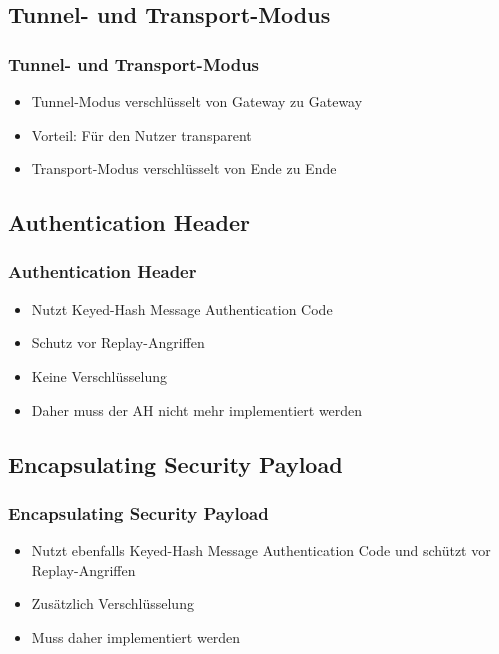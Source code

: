 \documentclass[t]{beamer}
\begin{document}
\subsection*{Tunnel- und Transport-Modus}
\begin{frame}
	\frametitle{Tunnel- und Transport-Modus}
	\begin{itemize}
		\vfill
		\item Tunnel-Modus verschlüsselt von Gateway zu Gateway
		\item Vorteil: Für den Nutzer transparent
		\vfill
		\item Transport-Modus verschlüsselt von Ende zu Ende %
		\vfill
	\end{itemize}
\end{frame}

\subsection*{Authentication Header}
\begin{frame}
	\frametitle{Authentication Header}
	\begin{itemize}
		\vfill
		\item Nutzt Keyed-Hash Message Authentication Code
		\vfill
		\item Schutz vor Replay-Angriffen
		\vfill
		\item Keine Verschlüsselung
		\vfill
		\item Daher muss der AH nicht mehr implementiert werden
		\vfill
	\end{itemize}
\end{frame}

\subsection*{Encapsulating Security Payload}
\begin{frame}
	\frametitle{Encapsulating Security Payload}
	\begin{itemize}
		\vfill
		\item Nutzt ebenfalls Keyed-Hash Message Authentication Code und schützt vor Replay-Angriffen
		\vfill
		\item Zusätzlich Verschlüsselung
		\vfill
		\item Muss daher implementiert werden
		\vfill
	\end{itemize}
\end{frame}
\end{document}
